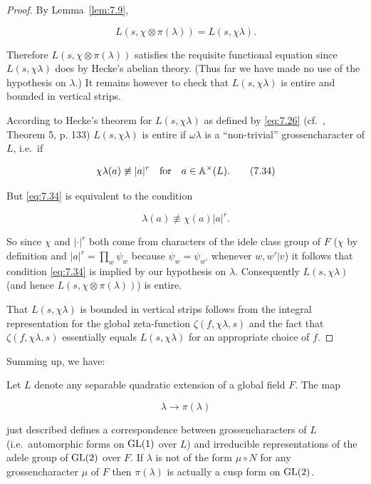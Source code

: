 \begin{proof}

By Lemma~\ref{lem:7.9},

\begin{equation}\label{eq:7.33}
L(s,\chi \otimes \pi(\lambda)) = L(s,\chi\lambda).\tag{7.33}
\end{equation}

Therefore $L(s,\chi \otimes \pi(\lambda))$ satisfies the requisite functional equation since $L(s,\chi\lambda)$ does by Hecke's abelian theory. (Thus far we have made no use of the hypothesis on $\lambda$.) It remains however to check that $L(s,\chi\lambda)$ is entire and bounded in vertical strips.

According to Hecke's theorem for $L(s,\chi\lambda)$ as defined by \eqref{eq:7.26} (cf.\ \cite{Weil4}, Theorem 5, p. 133) $L(s,\chi\lambda)$ is entire if $\omega\lambda$ is a ``non-trivial'' grossencharacter of $L$, i.e.\ if

\begin{equation}\label{eq:7.34}
\chi\lambda(a) \not\equiv |a|^{r} \quad \text{for} \quad a \in \mathbb{A}^{\times}(L).\tag{7.34}
\end{equation}

But \eqref{eq:7.34} is equivalent to the condition

\[
\lambda(a) \not\equiv \chi(a)|a|^{r}.
\]

So since $\chi$ and $|\cdot|^{r}$ both come from characters of the idele class group of $F$ ($\chi$ by definition and $|a|^{r} = \prod_w \psi_w$ because $\psi_w = \psi_{w'}$ whenever $w, w'|v$) it follows that condition \eqref{eq:7.34} is implied by our hypothesis on $\lambda$. Consequently $L(s,\chi\lambda)$ (and hence $L(s,\chi \otimes \pi(\lambda))$) is entire.

That $L(s,\chi\lambda)$ is bounded in vertical strips follows from the integral representation for the global zeta-function $\zeta(f,\chi\lambda,s)$ and the fact that $\zeta(f,\chi\lambda,s)$ essentially equals $L(s,\chi\lambda)$ for an appropriate choice of $f$.

\end{proof}

Summing up, we have:

\begin{theorem}\label{thm:7.11}

Let $L$ denote any separable quadratic extension of a global field $F$. The map

\[
\lambda \to \pi(\lambda)
\]

just described defines a correspondence between grossencharacters of $L$ (i.e.\ automorphic forms on $\operatorname{GL}(1)$ over $L$) and irreducible representations of the adele group of $\operatorname{GL}(2)$ over $F$. If $\lambda$ is not of the form $\mu \circ N$ for any grossencharacter $\mu$ of $F$ then $\pi(\lambda)$ is actually a cusp form on $\operatorname{GL}(2)$.

\end{theorem}

